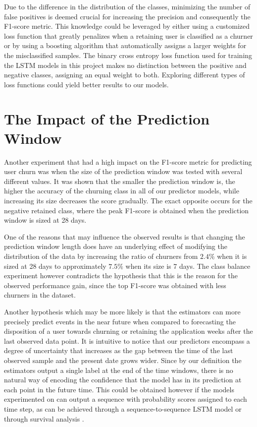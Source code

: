 \documentclass{kththesis}
\begin{document}
Due to the difference in the distribution of the classes, minimizing the number of false positives is deemed crucial for increasing the precision and consequently the F1-score metric. This knowledge could be leveraged by either using a customized loss function that greatly penalizes when a retaining user is classified as a churner or by using a boosting algorithm that automatically assigns a larger weights for the misclassified samples. The binary cross entropy loss function used for training the LSTM models in this project makes no distinction between the positive and negative classes, assigning an equal weight to both. Exploring different types of loss functions could yield better results to our models.

\section{The Impact of the Prediction Window}

Another experiment that had a high impact on the F1-score metric for predicting user churn was when the size of the prediction window was tested with several different values. It was shown that the smaller the prediction window is, the higher the accuracy of the churning class in all of our predictor models, while increasing its size decreases the score gradually. The exact opposite occurs for the negative retained class, where the peak F1-score is obtained when the prediction window is sized at 28 days.

One of the reasons that may influence the observed results is that changing the prediction window length does have an underlying effect of modifying the distribution of the data by increasing the ratio of churners from $2.4\%$ when it is sized at 28 days to approximately $7.5\%$ when its size is 7 days. The class balance experiment however contradicts the hypothesis that this is the reason for the observed performance gain, since the top F1-score was obtained with less churners in the dataset.

Another hypothesis which may be more likely is that the estimators can more precisely predict events in the near future when compared to forecasting the disposition of a user towards churning or retaining the application weeks after the last observed data point. It is intuitive to notice that our predictors encompass a degree of uncertainty that increases as the gap between the time of the last observed sample and the present date grows wider. Since by our definition the estimators output a single label at the end of the time windows, there is no natural way of encoding the confidence that the model has in its prediction at each point in the future time. This could be obtained however if the models experimented on can output a sequence with probability scores assigned to each time step, as can be achieved through a sequence-to-sequence LSTM \citep{cho2014learning} model or through survival analysis \citep{ibrahim2005bayesian}.
\end{document}
